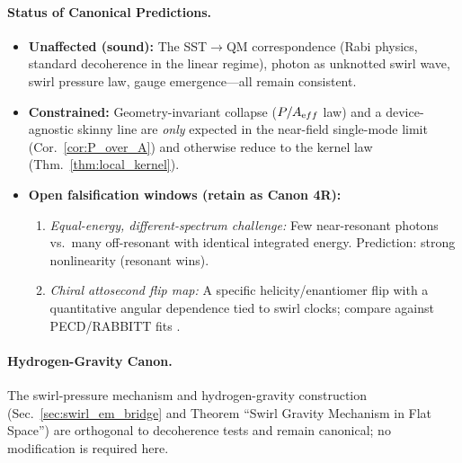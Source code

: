 \documentclass[11pt]{article}
\begin{document}
	\paragraph{Status of Canonical Predictions.}
	\begin{itemize}
		\item \textbf{Unaffected (sound):} The SST$\to$QM correspondence (Rabi physics, standard decoherence in the linear regime), photon as unknotted swirl wave, swirl pressure law, gauge emergence—all remain consistent.
		\item \textbf{Constrained:} Geometry-invariant collapse (\(P/A_{\textrm eff}\) law) and a device-agnostic skinny line are \emph{only} expected in the near-field single-mode limit (Cor.~\ref{cor:P_over_A}) and otherwise reduce to the kernel law (Thm.~\ref{thm:local_kernel}).
		\item \textbf{Open falsification windows (retain as Canon 4R):}
		\begin{enumerate}
			\item \emph{Equal-energy, different-spectrum challenge:} Few near-resonant photons vs.\ many off-resonant with identical integrated energy. Prediction: strong nonlinearity (resonant wins).
			\item \emph{Chiral attosecond flip map:} A specific helicity/enantiomer flip with a quantitative angular dependence tied to swirl clocks; compare against PECD/RABBITT fits \cite{Beaulieu2017Science}.
		\end{enumerate}
	\end{itemize}

	\paragraph{Hydrogen-Gravity Canon.}
	The swirl-pressure mechanism and hydrogen-gravity construction (Sec.~\ref{sec:swirl_em_bridge} and Theorem “Swirl Gravity Mechanism in Flat Space”) are orthogonal to decoherence tests and remain canonical; no modification is required here.
	\medskip
\end{document}
